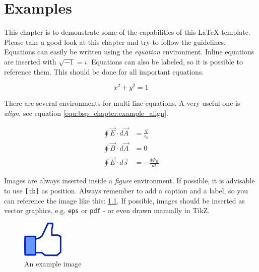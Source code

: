 
\chapter{Examples}

This chapter is to demonstrate some of the capabilities of this \LaTeX{} template.
Please take a good look at this chapter and try to follow the guidelines.\\

Equations can easily be written using the \emph{equation}
environment. Inline equations are inserted with $\sqrt{-1} = i $. Equations can
also be labeled, so it is possible to reference them. This should be done for
all important equations. 

\begin{equation}
	x^2 + y^2 = 1
	\label{equ:bsp_chapter:example_equation}
\end{equation}

There are several environments for multi line equations. A very useful one
is \emph{align}, see equation \ref{equ:bsp_chapter:example_align}.

\begin{align}
	\oint \vec{E} \cdot d \vec{A} &= \frac{q}{\epsilon_0} \\
	\oint \vec{B} \cdot d \vec{A} &= 0 \\
	\oint \vec{E} \cdot d \vec{s} &= - \frac{d \Phi_B}{dt}
	\label{equ:bsp_chapter:example_align}
\end{align}

Images are always inserted inside a \emph{figure}
environment. If possible, it is advisable to use \texttt{[tb]} as position.
Always remember to add a caption and a label, so you can reference the image
like this: \ref{fig:bsp_chapter:example_figure}. If possible, images should be
inserted as vector graphics, e.g. \texttt{eps} or \texttt{pdf} - or even drawn
manually in TikZ. \\ 

\begin{figure}[tb]
	\centering
	\includegraphics[width=2cm]{chapters/bsp_chapter/images/thumbs_up.jpg}
	\caption{An example image}
	\label{fig:bsp_chapter:example_figure}
\end{figure}

